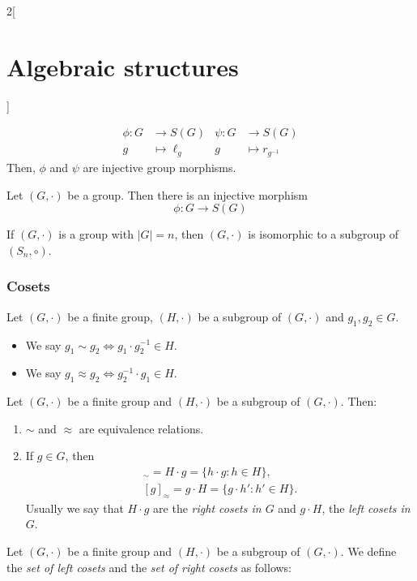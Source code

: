 \documentclass[../../../main.tex]{subfiles}
\begin{document}
\begin{multicols}{2}[\section{Algebraic structures}]
\begin{prop}
    \begin{align*}
        \phi:G&\longrightarrow S(G)&\psi:G&\longrightarrow S(G)\\
        g&\longmapsto \ell_g &g&\longmapsto r_{g^{-1}}
    \end{align*}
    Then, $\phi$ and $\psi$ are injective group morphisms.
\end{prop}
\begin{theorem}
    Let $(G,\cdot)$ be a group. Then there is an injective morphism $$\phi:G\longrightarrow S(G)$$
\end{theorem}
\begin{corollary}
    If $(G,\cdot)$ is a group with $|G|=n$, then $(G,\cdot)$ is isomorphic to a subgroup of $(S_n,\circ)$.
\end{corollary}
\subsubsection*{Cosets}
\begin{definition}\label{AS_equiv} 
    Let $(G,\cdot)$ be a finite group, $(H,\cdot)$ be a subgroup of $(G,\cdot)$ and $g_1,g_2\in G$. 
    \begin{itemize}
        \item We say $g_1\sim g_2\iff g_1\cdot g_2^{-1}\in H$.
        \item We say $g_1\approx g_2\iff g_2^{-1}\cdot g_1\in H$.
    \end{itemize}
\end{definition}
\begin{lemma}
    Let $(G,\cdot)$ be a finite group and $(H,\cdot)$ be a subgroup of $(G,\cdot)$. Then:
    \begin{enumerate}
        \item $\sim$ and $\approx$ are equivalence relations.
        \item If $g\in G$, then 
        \begin{gather*}
            [g]_\sim=H\cdot g=\{h\cdot g:h\in H\},\\ [g]_\approx=g\cdot H=\{g\cdot h':h'\in H\}.
        \end{gather*}
        Usually we say that $H\cdot g$ are the \textit{right cosets in $G$} and $g\cdot H$, the \textit{left cosets in $G$}. 
    \end{enumerate}
\end{lemma}
\begin{definition}
    Let $(G,\cdot)$ be a finite group and $(H,\cdot)$ be a subgroup of $(G,\cdot)$. We define the \textit{set of left cosets} and the \textit{set of right cosets} as follows:

\end{definition}
\end{multicols}
\end{document}
